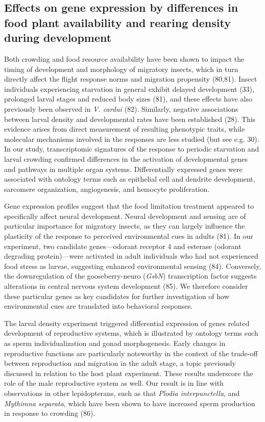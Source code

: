 \documentclass[lineno]{wiley-article}
\begin{document}
\subsection{Effects on gene expression by differences in food plant availability and rearing density during development}
Both crowding and food resource availability have been shown to impact the timing of development and morphology of migratory insects, which in turn directly affect the flight response norms and migration propensity (80,81). Insect individuals experiencing starvation in general exhibit delayed development (33), prolonged larval stages and reduced body sizes (81), and these effects have also previously been observed in \textit{V. cardui} (82). Similarly, negative associations between larval density and developmental rates have been established (28). This evidence arises from direct measurement of resulting phenotypic traits, while molecular mechanisms involved in the responses are less studied (but see e.g. 30). In our study, transcriptomic signatures of the response to periodic starvation and larval crowding confirmed differences in the activation of developmental genes and pathways in multiple organ systems. Differentially expressed genes were associated with ontology terms such as epithelial cell and dendrite development, sarcomere organization, angiogenesis, and hemocyte proliferation. 

Gene expression profiles suggest that the food limitation treatment appeared to specifically affect neural development. Neural development and sensing are of particular importance for migratory insects, as they can largely influence the plasticity of the response to perceived environmental cues in adults (81).  In our experiment, two candidate genes—odorant receptor 4 and esterase (odorant degrading protein)—were activated in adult individuals who had not experienced food stress as larvae, suggesting enhanced environmental sensing (84). Conversely, the downregulation of the gooseberry-neuro (\textit{GsbN}) transcription factor suggests alterations in central nervous system development (85). We therefore consider these particular genes as key candidates for further investigation of how environmental cues are translated into behavioral responses.

The larval density experiment triggered differential expression of genes related development of reproductive systems, which is illustrated by ontology terms such as sperm individualization and gonad morphogenesis. Early changes in reproductive functions are particularly noteworthy in the context of the trade-off between reproduction and migration in the adult stage, a topic previously discussed in relation to the host plant experiment. These results underscore the role of the male reproductive system as well. Our result is in line with observations in other lepidopterans, such as that \textit{Plodia interpunctella}, and \textit{Mythimna separata}, which have been shown to have increased sperm production in response to crowding (86).
\end{document}

